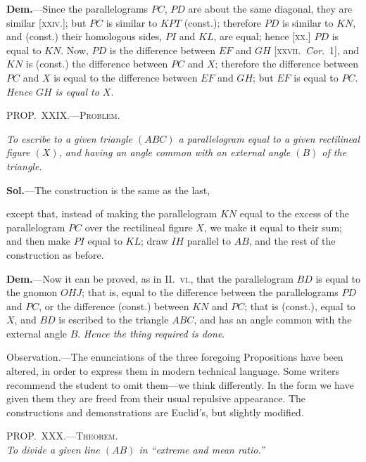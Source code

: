 \documentclass[oneside]{book}
\newcommand\myprop[2]{
\bigskip\Needspace*{4\baselineskip}\begin{center}\textsc{#1}\\\medskip\emph{#2}\par\end{center}
}
\newcommand\mypropl[2]{
\bigskip\Needspace*{4\baselineskip}\begin{center}\textsc{#1}\end{center}
\hspace{\parindent}\emph{#2}\par\medskip
}
\newcommand\imgcent[2]{
\begin{center}

\end{center}
}
\begin{document}
\textbf{Dem.}---Since the parallelograms $PC$, $PD$ are about
the same diagonal, they are similar [\textsc{xxiv.}]; but $PC$ is
similar to $KPT$ (const.); therefore $PD$ is similar to $KN$,
and (const.) their homologous sides, $PI$ and $KL$, are
equal; hence [\textsc{xx.}] $PD$ is equal to $KN$. Now, $PD$ is
the difference between $EF$ and $GH$ [\textsc{xxvii.}\ \textit{Cor}.~1], and
$KN$ is (const.) the difference between $PC$ and $X$; therefore
the difference between $PC$ and $X$ is equal to the
difference between $EF$ and $GH$; but $EF$ is equal to $PC$.
\emph{Hence $GH$ is equal to $X$}.

\mypropl{PROP\@.~XXIX\@.---Problem.}{To escribe to a given triangle $(ABC)$ a parallelogram
equal to a given rectilineal figure $(X)$, and having an
angle common with an external angle $(B)$ of the triangle.}

\textbf{Sol.}---The construction is the same as the last,

except that, instead of making the parallelogram $KN$
equal to the excess of the parallelogram $PC$ over the
rectilineal figure $X$, we make it equal to their sum;
and then make $PI$ equal to $KL$; draw $IH$ parallel to
$AB$, and the rest of the construction as before.


\imgcent{280}{f209}

\textbf{Dem.}---Now it can be proved, as in II\@.~\textsc{vi}., that
the parallelogram $BD$ is equal to the gnomon $OHJ$;
that is, equal to the difference between the parallelograms
$PD$ and $PC$, or the difference (const.) between
$KN$ and $PC$; that is (const.), equal to $X$, and $BD$ is
escribed to the triangle $ABC$, and has an angle common
with the external angle $B$. \textit{Hence the thing required
is done}.

\smallskip
\begin{footnotesize}
\textsf{Observation.}---The enunciations of the three foregoing Propositions
have been altered, in order to express them in modern
technical language. Some writers recommend the student to
omit them---we think differently. In the form we have given
them they are freed from their usual repulsive appearance. The
constructions and demonstrations are Euclid's, but slightly modified.
\par\end{footnotesize}



\myprop{PROP\@.~XXX\@.---Theorem.}{To divide a given line $(AB)$ in ``extreme and mean ratio.''}
\end{document}
